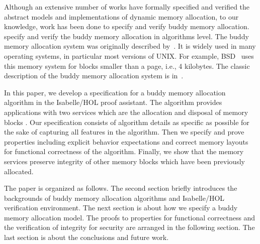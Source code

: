  Although an extensive number of works have formally specified and verified the abstract models and implementations of dynamic memory allocation, to our knowledge,    work has been done to specify and verify buddy memory allocation.  specify and verify the buddy memory allocation in algorithms level. The buddy memory allocation system was originally described by~\cite{reg_knowlton}. It is widely used in many operating systems, in particular most versions of UNIX. For example, BSD~\cite{reg_mckusick} uses this memory system for blocks smaller than a page, i.e., 4 kilobytes. The classic description  of the buddy memory allocation system is  in~\cite{reg_knuth}. 

In this paper, we develop a specification for a buddy memory allocation algorithm in the Isabelle/HOL proof assistant. The algorithm provides applications with two services which are the allocation and disposal of memory blocks . Our specification consists of  algorithm details as specific as possible for the sake of capturing all features in the algorithm. Then we specify and prove properties including explicit behavior expectations and correct memory layouts for functional correctness of the algorithm. Finally, we show that the memory services preserve integrity of other memory blocks which have been previously allocated.

The paper is organized as follows. The second section briefly introduces the backgrounds of buddy memory allocation algorithms and  Isabelle/HOL verification environment. The next section is about how we specify a buddy memory allocation model. The proofs to properties for functional correctness and the verification of integrity for security are arranged in the following section. The last section is about the conclusions and future work.
